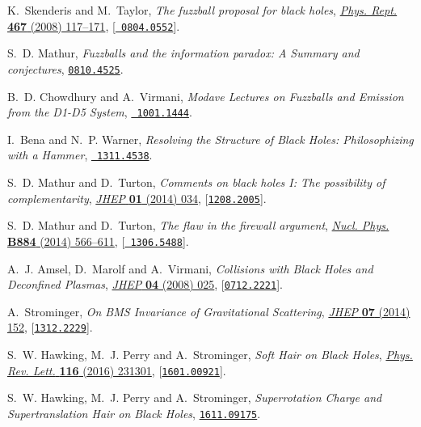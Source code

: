 \documentclass[10pt]{article}
\begin{document}
\begin{thebibliography}{100}
K.~Skenderis and M.~Taylor, \emph{{The fuzzball proposal for black holes}},
  \href{http://dx.doi.org/10.1016/j.physrep.2008.08.001}{\emph{Phys. Rept.}
  {\bf 467} (2008) 117--171}, [\href{http://arxiv.org/abs/0804.0552}{{\tt
  0804.0552}}].

S.~D. Mathur, \emph{{Fuzzballs and the information paradox: A Summary and
  conjectures}},  \href{http://arxiv.org/abs/0810.4525}{{\tt 0810.4525}}.

B.~D. Chowdhury and A.~Virmani, \emph{{Modave Lectures on Fuzzballs and
  Emission from the D1-D5 System}},  \href{http://arxiv.org/abs/1001.1444}{{\tt
  1001.1444}}.

I.~Bena and N.~P. Warner, \emph{{Resolving the Structure of Black Holes:
  Philosophizing with a Hammer}},  \href{http://arxiv.org/abs/1311.4538}{{\tt
  1311.4538}}.

S.~D. Mathur and D.~Turton, \emph{{Comments on black holes I: The possibility
  of complementarity}},
  \href{http://dx.doi.org/10.1007/JHEP01(2014)034}{\emph{JHEP} {\bf 01} (2014)
  034}, [\href{http://arxiv.org/abs/1208.2005}{{\tt 1208.2005}}].

S.~D. Mathur and D.~Turton, \emph{{The flaw in the firewall argument}},
  \href{http://dx.doi.org/10.1016/j.nuclphysb.2014.05.012}{\emph{Nucl. Phys.}
  {\bf B884} (2014) 566--611}, [\href{http://arxiv.org/abs/1306.5488}{{\tt
  1306.5488}}].

A.~J. Amsel, D.~Marolf and A.~Virmani, \emph{{Collisions with Black Holes and
  Deconfined Plasmas}},
  \href{http://dx.doi.org/10.1088/1126-6708/2008/04/025}{\emph{JHEP} {\bf 04}
  (2008) 025}, [\href{http://arxiv.org/abs/0712.2221}{{\tt 0712.2221}}].

A.~Strominger, \emph{{On BMS Invariance of Gravitational Scattering}},
  \href{http://dx.doi.org/10.1007/JHEP07(2014)152}{\emph{JHEP} {\bf 07} (2014)
  152}, [\href{http://arxiv.org/abs/1312.2229}{{\tt 1312.2229}}].

S.~W. Hawking, M.~J. Perry and A.~Strominger, \emph{{Soft Hair on Black
  Holes}}, \href{http://dx.doi.org/10.1103/PhysRevLett.116.231301}{\emph{Phys.
  Rev. Lett.} {\bf 116} (2016) 231301},
  [\href{http://arxiv.org/abs/1601.00921}{{\tt 1601.00921}}].

S.~W. Hawking, M.~J. Perry and A.~Strominger, \emph{{Superrotation Charge and
  Supertranslation Hair on Black Holes}},
  \href{http://arxiv.org/abs/1611.09175}{{\tt 1611.09175}}.


\end{thebibliography}
\end{document}
